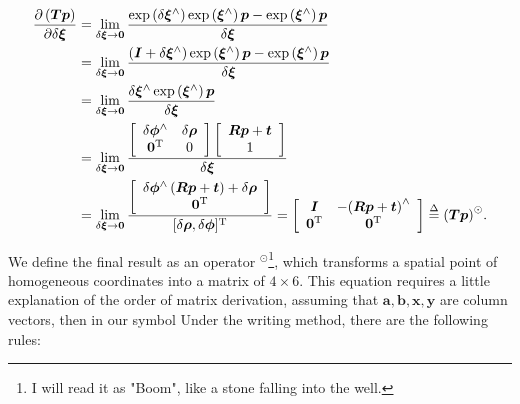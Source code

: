 \begin{align*}
\frac{{\partial \left( \bm{Tp} \right)}}{{\partial \delta \boldsymbol{\xi}}} &= \mathop {\lim }\limits_{\delta \boldsymbol{\xi}  \to \bm{0}} \frac{{\exp \left( {\delta {\boldsymbol{\xi} ^ \wedge }} \right)\exp \left( {{\boldsymbol{\xi} ^ \wedge }} \right) \bm{p} - \exp \left( {{\boldsymbol{\xi} ^ \wedge }} \right) \bm{p} }}{{\delta \boldsymbol{\xi} }}\\
&= \mathop {\lim }\limits_{\delta \boldsymbol{\xi}  \to \bm{0}} \frac{{\left( { \bm{I} + \delta {\boldsymbol{\xi} ^ \wedge }} \right)\exp \left( {{\boldsymbol{\xi} ^ \wedge }} \right) \bm{p} - \exp \left( {{\boldsymbol{\xi} ^ \wedge }} \right) \bm{p} }}{{\delta {\boldsymbol{\xi} }}}\\
&= \mathop {\lim }\limits_{\delta \boldsymbol{\xi}  \to \bm{0}} \frac{{\delta {\boldsymbol{\xi} ^ \wedge }\exp \left( {{\boldsymbol{\xi} ^ \wedge }} \right) \bm{p}}}{{\delta {\boldsymbol{\xi} }}}\\
&= \mathop {\lim }\limits_{\delta \boldsymbol{\xi}  \to \bm{0}} 
\frac{{\left[ {\begin{array}{*{20}{c}}
			{\delta { \boldsymbol{\phi} ^ \wedge }}&{\delta {\boldsymbol{\rho} }}\\
			{{\bm{0}^\mathrm{T}}}&0
			\end{array}} \right]\left[ {\begin{array}{*{20}{c}}
			{\bm{Rp} + \bm{t}}\\
			1
			\end{array}} \right]}}{{\delta {\boldsymbol{\xi} }}}\\
&= \mathop {\lim }\limits_{\delta \boldsymbol{\xi}  \to \bm{0}} \frac{{\left[ {\begin{array}{*{20}{c}}
			{\delta {\boldsymbol{\phi} ^ \wedge }\left( {\bm{Rp} + \bm{t}} \right) + \delta {\boldsymbol{\rho} }}\\
			\bm{0}^\mathrm{T}
			\end{array}} \right]}}{[\delta\boldsymbol{\rho},\delta \boldsymbol{\phi}]^\mathrm{T}} = \left[ {\begin{array}{*{20}{c}}
	\bm{I} & { - {{\left( {\bm{Rp} + \bm{t}} \right)}^ \wedge }} \\
	{{\bm{0}}}^\mathrm{T} & \bm{0}^\mathrm{T}
	\end{array}} \right] \buildrel \Delta \over = {\left( \bm{Tp} \right)^ \odot }.
\end{align*}

We define the final result as an operator $^\odot$\footnote{I will read it as "Boom", like a stone falling into the well. }, which transforms a spatial point of homogeneous coordinates into a matrix of $4 \times 6$. This equation requires a little explanation of the order of matrix derivation, assuming that $\bm{a}, \bm{b}, \bm{x}, \bm{y}$ are column vectors, then in our symbol Under the writing method, there are the following rules:

